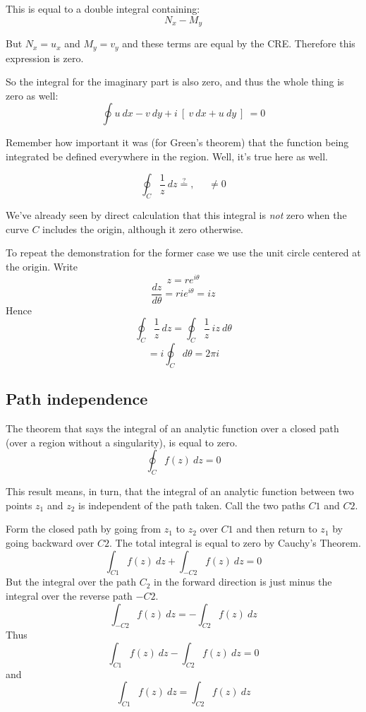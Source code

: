 \documentclass[11pt, oneside]{article}
\begin{document}
This is equal to a double integral containing:
\[ N_x - M_y \]

But $N_x = u_x$ and $M_y = v_y$ and these terms are equal by the CRE.  Therefore this expression is zero.

So the integral for the imaginary part is also zero, and thus the whole thing is zero as well:
\[ \oint u \ dx - v \ dy + i \ [ \  v \ dx + u \ dy \ ] \ = 0 \]

Remember how important it was (for Green's theorem) that the function being integrated be defined everywhere in the region.  Well, it's true here as well.

\[ \oint_C \frac{1}{z} \ dz \stackrel{?}{=} , \ \ \ \ \ \ \ne 0 \]

We've already seen by direct calculation that this integral is \emph{not} zero when the curve $C$ includes the origin, although it zero otherwise.

To repeat the demonstration for the former case we use the unit circle centered at the origin.  Write
\[ z = r e^{i\theta} \]
\[  \frac{dz}{d\theta} = r i e^{i\theta} = iz \]
Hence
\[ \oint_C \frac{1}{z} \ dz = \oint_C \frac{1}{z} \ iz \ d \theta \]
\[ = i   \oint_C  d \theta = 2 \pi i \]

\subsection*{Path independence}
The theorem that says the integral of an analytic function over a closed path (over a region without a singularity), is equal to zero.
\[ \oint_C f(z) \ dz = 0 \]

This result means, in turn, that the integral of an analytic function between two points $z_1$ and $z_2$ is independent of the path taken.  Call the two paths $C1$ and $C2$.  

Form the closed path by going from $z_1$ to $z_2$ over $C1$ and then return to $z_1$ by going backward over $C2$.  The total integral is equal to zero by Cauchy's Theorem.
\[ \int_{C1} f(z) \ dz + \int_{-C2} f(z) \ dz = 0 \]
But the integral over the path $C_2$ in the forward direction is just minus the integral over the reverse path $-C2$.
\[ \int_{-C2} f(z) \ dz = - \int_{C2} f(z) \ dz \]
Thus
\[ \int_{C1} f(z) \ dz - \int_{C2} f(z) \ dz = 0 \]
and
\[ \int_{C1} f(z) \ dz = \int_{C2} f(z) \ dz \]
\end{document}
